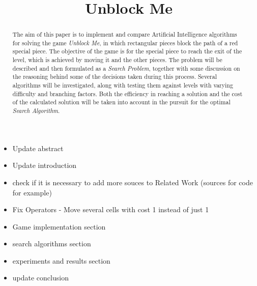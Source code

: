 \documentclass[conference]{IEEEtran}
\begin{document}
\title{Unblock Me}

\author{
\and
{}
\and
{}
}

\maketitle

\begin{itemize}
    \item Update abstract
    \item Update introduction
    \item check if it is necessary to add more souces to Related Work (sources for code for example)
    \item Fix Operators - Move several cells with cost 1 instead of just 1
    \item Game implementation section
    \item search algorithms section
    \item experiments and results section
    \item update conclusion
\end{itemize}


\begin{abstract}
The aim of this paper is to implement and compare Artificial Intelligence algorithms for solving the game \textit{Unblock Me}, in which rectangular pieces block the path of a red special piece. The objective of the game is for the special piece to reach the exit of the level, which is achieved by moving it and the other pieces.
The problem will be described and then formulated as a \textit{Search Problem}, together with some discussion on the reasoning behind some of the decisions taken during this process.
Several algorithms will be investigated, along with testing them against levels with varying difficulty and branching factors. Both the efficiency in reaching a solution and the cost of the calculated solution will be taken into account in the pursuit for the optimal \textit{Search Algorithm}.
\end{abstract}
\end{document}
